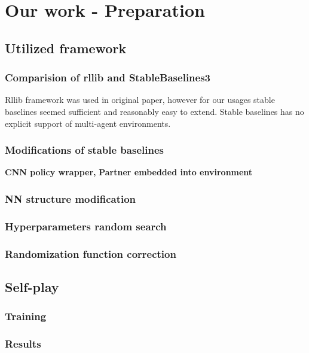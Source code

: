 \chapter{Our work - Preparation}

\section{Utilized framework}
\subsection*{Comparision of rllib and StableBaselines3}
Rllib framework was used in original paper, however for our usages stable baselines seemed sufficient and reasonably easy to extend.
Stable baselines has no explicit support of multi-agent environments.
\subsection{Modifications of stable baselines}
\par
\textbf{CNN policy wrapper,}
\textbf{Partner embedded into environment}

\subsection{NN structure modification}

\subsection{Hyperparameters random search}

\subsection{Randomization function correction}

\section{Self-play}
\subsection{Training}
\subsection{Results}



